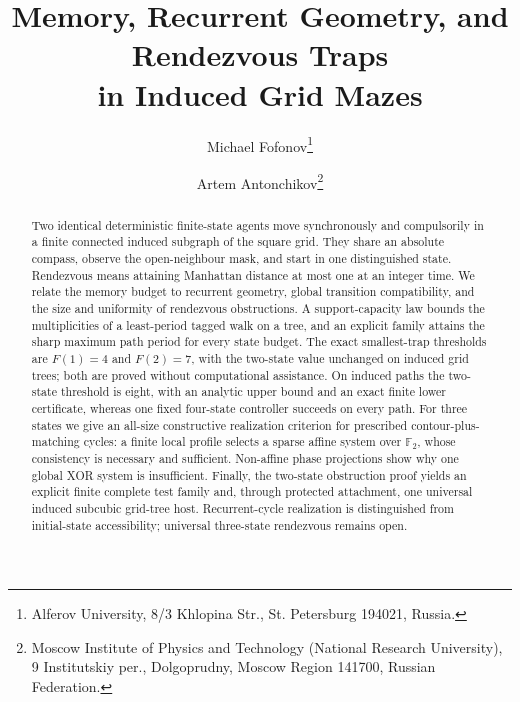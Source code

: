 \documentclass[11pt,a4paper]{article}
\title{Memory, Recurrent Geometry, and Rendezvous Traps\\in Induced Grid Mazes}
\author{%
Michael Fofonov\thanks{Alferov University, 8/3 Khlopina Str., St. Petersburg 194021, Russia.}
\and
Artem Antonchikov\thanks{Moscow Institute of Physics and Technology (National Research University),
9 Institutskiy per., Dolgoprudny, Moscow Region 141700, Russian Federation.}
}
\date{}
\theoremstyle{definition}
\newcommand{\Ftwo}{\mathbb F_2}
\begin{document}
\maketitle
\begin{abstract}
Two identical deterministic finite-state agents move synchronously and compulsorily
in a finite connected induced subgraph of the square grid. They share an absolute
compass, observe the open-neighbour mask, and start in one distinguished state.
Rendezvous means attaining Manhattan distance at most one at an integer time.
We relate the memory budget to recurrent geometry, global transition compatibility,
and the size and uniformity of rendezvous obstructions. A support-capacity law bounds
the multiplicities of a least-period tagged walk on a tree, and an explicit family
attains the sharp maximum path period for every state budget. The exact smallest-trap
thresholds are $F(1)=4$ and $F(2)=7$, with the two-state value unchanged on induced
grid trees; both are proved without computational assistance. On induced paths the two-state threshold is eight,
with an analytic upper bound and an exact finite lower certificate, whereas one fixed
four-state controller succeeds on every path. For three states we give an all-size
constructive realization criterion for prescribed contour-plus-matching cycles:
a finite local profile selects a sparse affine system over $\Ftwo$, whose consistency
is necessary and sufficient. Non-affine phase projections show why one global XOR
system is insufficient. Finally, the two-state obstruction proof yields an
explicit finite complete test family and, through protected attachment, one universal
induced subcubic grid-tree host. Recurrent-cycle realization is distinguished from
initial-state accessibility; universal three-state rendezvous remains open.
\end{abstract}












\FloatBarrier
\appendix






\FloatBarrier


\end{document}
